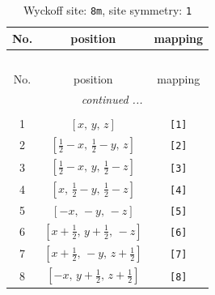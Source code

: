 \documentclass[fleqn,8pt]{jsarticle}
\begin{document}
\renewcommand{\arraystretch}{1.2}
\begin{longtable}{ccc}
\caption{Wyckoff site: {\tt 8m}, site symmetry: {\tt 1}}
 \\
 \hline \hline
No. & position & mapping \\ \hline \endfirsthead

\multicolumn{2}{l}{\tablename\ \thetable{}} \\
 \hline \hline
No. & position & mapping \\ \hline \endhead

 \hline \hline
\multicolumn{2}{r}{\footnotesize\it continued ...} \\ \endfoot

 \hline \hline
\multicolumn{2}{r}{} \\ \endlastfoot

1 & $\left[ x,\, y,\, z \right]$ & {\tt [1]} \\ \hline
2 & $\left[ \frac{1}{2} - x,\, \frac{1}{2} - y,\, z \right]$ & {\tt [2]} \\ \hline
3 & $\left[ \frac{1}{2} - x,\, y,\, \frac{1}{2} - z \right]$ & {\tt [3]} \\ \hline
4 & $\left[ x,\, \frac{1}{2} - y,\, \frac{1}{2} - z \right]$ & {\tt [4]} \\ \hline
5 & $\left[ - x,\, - y,\, - z \right]$ & {\tt [5]} \\ \hline
6 & $\left[ x + \frac{1}{2},\, y + \frac{1}{2},\, - z \right]$ & {\tt [6]} \\ \hline
7 & $\left[ x + \frac{1}{2},\, - y,\, z + \frac{1}{2} \right]$ & {\tt [7]} \\ \hline
8 & $\left[ - x,\, y + \frac{1}{2},\, z + \frac{1}{2} \right]$ & {\tt [8]} \\
\end{longtable}
\end{document}
